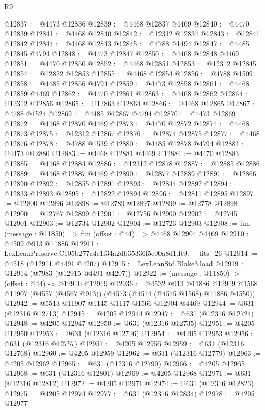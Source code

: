 \begin{lexlean}{R9}
\begin{coremodule}
@12837 := @4473 @12836
@12839 := @4468 @12837 @4469
@12840 := @4470 @12839
@12841 := @4468 @12840
@12842 := @12312 @12834
@12843 := @12841 @12842
@12844 := @4468 @12843
@12845 := @4788 @1494
@12847 := @4485 @12845 @4794
@12848 := @4473 @12847
@12850 := @4468 @12848 @4469
@12851 := @4470 @12850
@12852 := @4468 @12851
@12853 := @12312 @12845
@12854 := @12852 @12853
@12855 := @4468 @12854
@12856 := @4788 @1509
@12858 := @4485 @12856 @4794
@12859 := @4473 @12858
@12861 := @4468 @12859 @4469
@12862 := @4470 @12861
@12863 := @4468 @12862
@12864 := @12312 @12856
@12865 := @12863 @12864
@12866 := @4468 @12865
@12867 := @4788 @1524
@12869 := @4485 @12867 @4794
@12870 := @4473 @12869
@12872 := @4468 @12870 @4469
@12873 := @4470 @12872
@12874 := @4468 @12873
@12875 := @12312 @12867
@12876 := @12874 @12875
@12877 := @4468 @12876
@12878 := @4788 @1539
@12880 := @4485 @12878 @4794
@12881 := @4473 @12880
@12883 := @4468 @12881 @4469
@12884 := @4470 @12883
@12885 := @4468 @12884
@12886 := @12312 @12878
@12887 := @12885 @12886
@12889 := @4468 @12887 @4469
@12890 := @12877 @12889
@12891 := @12866 @12890
@12892 := @12855 @12891
@12893 := @12844 @12892
@12894 := @12833 @12893
@12895 := @12822 @12894
@12896 := @12811 @12895
@12897 := @12800 @12896
@12898 := @12789 @12897
@12899 := @12778 @12898
@12900 := @12767 @12899
@12901 := @12756 @12900
@12902 := @12745 @12901
@12903 := @12734 @12902
@12904 := @12723 @12903
@12908 := fun (message : @11850) => fun (offset : @44) => @4468 @12904 @4469
@12910 := @4509 @913 @11886
@12911 := LexLeanPreserve.C105b277a4c1f34a2db35336f5e00a8d1.R9.__fits_26
@12914 := @4518 (@12911 @4491 @4207)
@12915 := LexLeanStd.Blake3.load
@12919 := @12914 (@7983 (@12915 @4491 @4207))
@12922 := (message : @11850) -> (offset : @44) -> @12910 @12919
@12936 := @4532
    @913
    @11886
    @12919
    @1568
    @11907
    (@4557 (@4567 @913))
    (@4573 (@4574 (@4575 @1568) @11886 @4550))
@12942 := @5513 @11907 @1145 @1117 @1566 @12904 @4469
@12944 := @631 (@12316 @12713)
@12945 := @4205 @12944
@12947 := @631 (@12316 @12724)
@12948 := @4205 @12947
@12950 := @631 (@12316 @12735)
@12951 := @4205 @12950
@12953 := @631 (@12316 @12746)
@12954 := @4205 @12953
@12956 := @631 (@12316 @12757)
@12957 := @4205 @12956
@12959 := @631 (@12316 @12768)
@12960 := @4205 @12959
@12962 := @631 (@12316 @12779)
@12963 := @4205 @12962
@12965 := @631 (@12316 @12790)
@12966 := @4205 @12965
@12968 := @631 (@12316 @12801)
@12969 := @4205 @12968
@12971 := @631 (@12316 @12812)
@12972 := @4205 @12971
@12974 := @631 (@12316 @12823)
@12975 := @4205 @12974
@12977 := @631 (@12316 @12834)
@12978 := @4205 @12977

\end{coremodule}
\end{lexlean}
